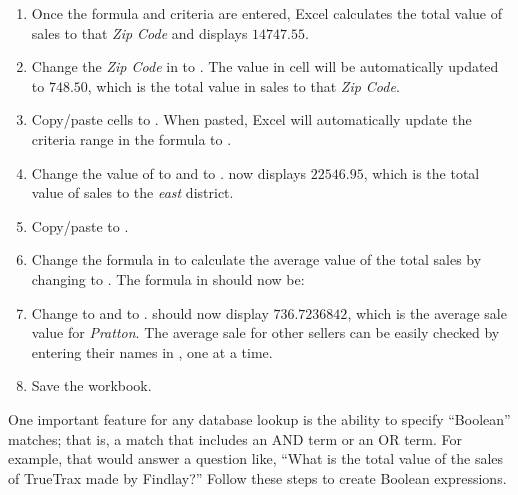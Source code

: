 \begin{enumbox}
\begin{enumerate}
		\item Once the formula and criteria are entered, Excel calculates the total value of sales to that \textit{Zip Code} and displays $ 14747.55 $.
		\item Change the \textit{Zip Code} in  to . The value in cell  will be automatically updated to $ 748.50 $, which is the total value in sales to that \textit{Zip Code}.
		\item Copy/paste cells  to . When pasted, Excel will automatically update the criteria range in the formula to .
		\item Change the value of  to  and  to .  now displays $ 22546.95 $, which is the total value of sales to the \textit{east} district.
		\item Copy/paste  to .
		\item Change the formula in  to calculate the average value of the total sales by changing  to . The formula in  should now be: 
		\item Change  to  and  to .  should now display $ 736.7236842 $, which is the average sale value for \textit{Pratton}. The average sale for other sellers can be easily checked by entering their names in , one at a time.
		\item Save the  workbook.
	\end{enumerate}
\end{enumbox}
	
One important feature for any database lookup is the ability to specify ``Boolean'' matches; that is, a match that includes an AND term or an OR term. For example, that would answer a question like, ``What is the total value of the sales of TrueTrax made by Findlay?'' Follow these steps to create Boolean expressions.

